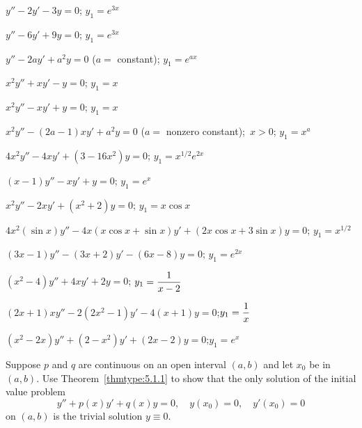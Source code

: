 \begin{exerciselist}

  \item\label{exer:5.1.10} $y''-2y'-3y=0$; \quad $y_{1}=e^{3x}$

  \item\label{exer:5.1.11} $y''-6y'+9y=0$; \quad $y_{1}=e^{3x}$

  \item\label{exer:5.1.12}%
  $y''-2ay'+a^{2}y=0$\; ($a=$ constant); \quad $y_{1}=e^{ax}$

  \item\label{exer:5.1.13} $x^{2}y''+xy'-y=0$; \quad $y_{1}=x$

  \item\label{exer:5.1.14} $x^{2}y''-xy'+y=0$; \quad $y_{1}=x$

  \item\label{exer:5.1.15} $x^{2}y''-(2a-1)xy'+a^{2}y=0$\; ($a=$ nonzero constant);\, $x>0$; \quad
        $y_{1}=x^{a}$

  \item\label{exer:5.1.16} $4x^{2}y''-4xy'+(3-16x^{2})y=0$; \quad $y_{1}=x^{1/2}e^{2x}$

  \item\label{exer:5.1.17} $(x-1)y''-xy'+y=0$; \quad $y_{1}=e^{x}$

  \item\label{exer:5.1.18} $x^{2}y''-2xy'+(x^{2}+2)y=0$; \quad $y_{1}=x\cos x$

  \item\label{exer:5.1.19} $4x^{2}(\sin x)y''-4x(x\cos x+\sin x)y'+(2x\cos x+3\sin x)y=0$; \quad
        $y_{1}=x^{1/2}$

  \item\label{exer:5.1.20} $(3x-1)y''-(3x+2)y'-(6x-8)y=0$; \quad $y_{1}=e^{2x}$

  \item\label{exer:5.1.21} $(x^{2}-4)y''+4xy'+2y=0$; \quad $y_{1}=\displaystyle\frac{1}{x-2}$

  \item\label{exer:5.1.22} $(2x+1)xy''-2(2x^{2}-1)y'-4(x+1)y=0$;\quad $y_{1}=\displaystyle\frac{1}{x}$

  \item\label{exer:5.1.23} $(x^{2}-2x)y''+(2-x^{2})y'+(2x-2)y=0$;\quad $y_{1}=e^{x}$

  \item\label{exer:5.1.24} Suppose $p$ and $q$ are continuous on an open interval $(a,b)$ and let
        $x_{0}$ be in $(a,b)$. Use Theorem~\ref{thmtype:5.1.1} to show that the only solution of the
        initial value problem
  \[
    y''+p(x)y'+q(x)y=0,\quad y(x_{0})=0,\quad y'(x_{0})=0
  \]
  on $(a,b)$ is the trivial solution $y\equiv0$.


\end{exerciselist}
